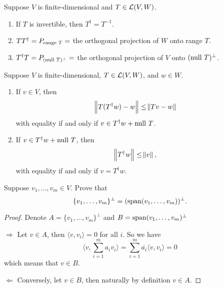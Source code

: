 \documentclass{extarticle}
\begin{document}
\begin{corollary}
    Suppose \(V\) is finite-dimensional and \(T \in \mathcal{L}(V, W)\). 
    \begin{enumerate}[label=(\alph*)]
        \item If \(T\) is invertible, then \(T^\dagger = T^{-1}\). 
        \item \(T T^\dagger = P_{\text{range } T} =\) the orthogonal projection of \(W\) onto range \(T\). 
        \item \(T^\dagger T = P_{(\text{null } T)^\perp} = \) the orthogonal projection of \(V\) onto \((\text{null } T)^\perp\).
    \end{enumerate}
\end{corollary}

\begin{thm}
    Suppose \(V\) is finite-dimensional, \(T \in \mathcal{L}(V, W)\), and \(w \in W\). 
    \begin{enumerate}[label=(\alph*)]
        \item If \(v \in V\), then 
        \[\norm{T(T^\dagger w) - w} \leq \norm{Tv - w}\]
        with equality if and only if \(v \in T^\dagger w + \text{null } T\). 

        \item If \(v \in T^\dagger w + \text{null } T\), then 
        \[\norm{T^\dagger w} \leq \norm{v},\]
        with equality if and only if \(v = T^\dagger w\). 
    \end{enumerate}
\end{thm}








\newpage 
{}


\begin{problem}{1}
    Suppose \(v_1, \ldots, v_m \in V\). Prove that 
    \[\{v_1, \ldots, v_m\}^\perp  = (\text{span} (v_1, \ldots, v_m))^\perp. \]
\end{problem}

\begin{proof}

Denote \(A = \{v_1, \ldots, v_m\}^\perp\) and \(B = \text{span} (v_1, \ldots, v_m)^\perp\)

\(\Rightarrow\) Let \( v \in A\), then \(\langle v,v_i \rangle =0 \) for all \(i\). So we have 
\[\langle v,\sum_{i=1}^{m} a_i v_i \rangle = \sum_{i=1}^{m} \overline{a_i} \langle v,v_i \rangle = 0\]
which means that \(v \in B\). 

\(\Leftarrow\) Conversely, let \(v \in B\), then naturally by definition \(v \in A\).
\end{proof}
\end{document}
